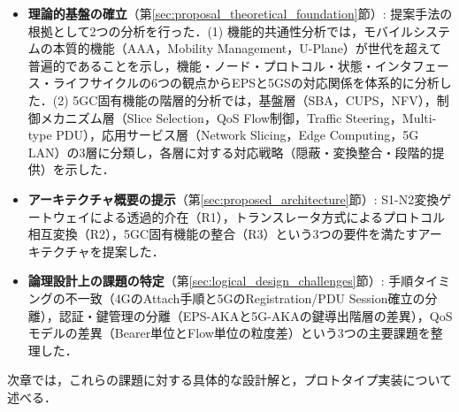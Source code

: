 \begin{itemize}
    \item \textbf{理論的基盤の確立}（第\ref{sec:proposal_theoretical_foundation}節）: 提案手法の根拠として2つの分析を行った．(1) 機能的共通性分析では，モバイルシステムの本質的機能（AAA，Mobility Management，U-Plane）が世代を超えて普遍的であることを示し，機能・ノード・プロトコル・状態・インタフェース・ライフサイクルの6つの観点からEPSと5GSの対応関係を体系的に分析した．(2) 5GC固有機能の階層的分析では，基盤層（SBA，CUPS，NFV），制御メカニズム層（Slice Selection，QoS Flow制御，Traffic Steering，Multi-type PDU），応用サービス層（Network Slicing，Edge Computing，5G LAN）の3層に分類し，各層に対する対応戦略（隠蔽・変換整合・段階的提供）を示した．
    \item \textbf{アーキテクチャ概要の提示}（第\ref{sec:proposed_architecture}節）: S1-N2変換ゲートウェイによる透過的介在（R1），トランスレータ方式によるプロトコル相互変換（R2），5GC固有機能の整合（R3）という3つの要件を満たすアーキテクチャを提案した．
    \item \textbf{論理設計上の課題の特定}（第\ref{sec:logical_design_challenges}節）: 手順タイミングの不一致（4GのAttach手順と5GのRegistration/PDU Session確立の分離），認証・鍵管理の分離（EPS-AKAと5G-AKAの鍵導出階層の差異），QoSモデルの差異（Bearer単位とFlow単位の粒度差）という3つの主要課題を整理した．
\end{itemize}

次章では，これらの課題に対する具体的な設計解と，プロトタイプ実装について述べる．
